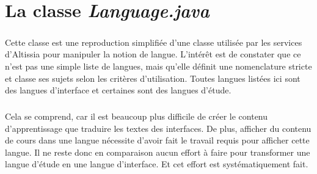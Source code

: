 \chapter{La classe \textit{Language.java}}
\label{ch:language-java}

\paragraph{}
Cette classe est une reproduction simplifiée d'une classe utilisée par les services d'Altissia pour manipuler la notion de langue.
L'intérêt est de constater que ce n'est pas une simple liste de langues, mais qu'elle définit une nomenclature stricte et classe ses sujets selon les critères d'utilisation.
Toutes langues listées ici sont des langues d'interface et certaines sont des langues d'étude.

\paragraph{}
Cela se comprend, car il est beaucoup plus difficile de créer le contenu d'apprentissage que traduire les textes des interfaces.
De plus, afficher du contenu de cours dans une langue nécessite d'avoir fait le travail requis pour afficher cette langue.
Il ne reste donc en comparaison aucun effort à faire pour transformer une langue d'étude en une langue d'interface.
Et cet effort est systématiquement fait.


